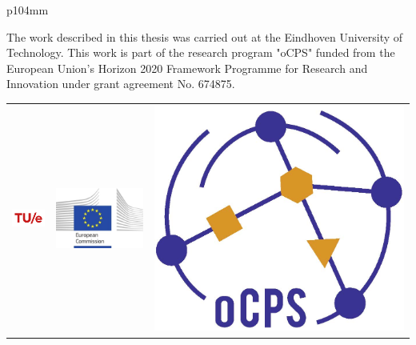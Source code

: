 \thispagestyle{empty}
\noindent
\begin{tabular}{p{104mm}}

\noindent
The work described in this thesis was carried out at the Eindhoven University of Technology. 
This work is part of the research program "oCPS" funded from the European Union's Horizon 2020 Framework Programme for Research and Innovation under grant agreement No. 674875.
\\[6mm]

\begin{tabular}{ccc}
    \includegraphics[width=3cm]{Figures/TUe-logo-scarlet-L.png}&  
     \includegraphics[scale=0.3]{Figures/European_Commission.jpg}&
    \includegraphics[scale=0.2]{Figures/oCPSlogo.jpg}
    
\end{tabular}

\\[6mm]

\end{tabular}

